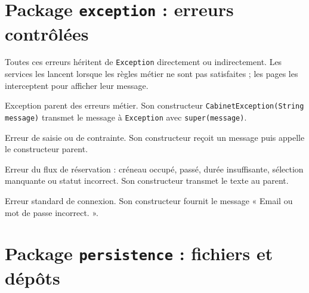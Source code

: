 \documentclass[11pt,a4paper]{report}
\begin{document}
\chapter{Package \texttt{exception} : erreurs contrôlées}
Toutes ces erreurs héritent de \texttt{Exception} directement ou indirectement. Les services les lancent lorsque les règles métier ne sont pas satisfaites ; les pages les interceptent pour afficher leur message.
\begin{description}[leftmargin=4.6cm,style=nextline]
\item[\texttt{CabinetException.java}] Exception parent des erreurs métier. Son constructeur \texttt{CabinetException(String message)} transmet le message à \texttt{Exception} avec \texttt{super(message)}.
\item[\texttt{ValidationException.java}] Erreur de saisie ou de contrainte. Son constructeur reçoit un message puis appelle le constructeur parent.
\item[\texttt{ReservationException.java}] Erreur du flux de réservation : créneau occupé, passé, durée insuffisante, sélection manquante ou statut incorrect. Son constructeur transmet le texte au parent.
\item[\texttt{AuthentificationException.java}] Erreur standard de connexion. Son constructeur fournit le message « Email ou mot de passe incorrect. ».
\end{description}

\chapter{Package \texttt{persistence} : fichiers et dépôts}
\end{document}
